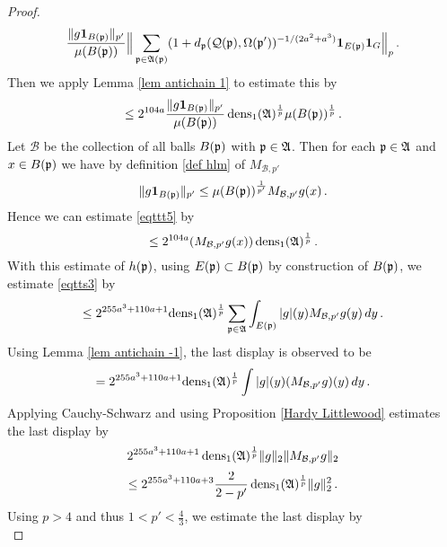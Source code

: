 {\begin{proof}
\begin{equation}
    \frac{\|g\mathbf{1}_{B(\mathfrak p)}\|_{p'}}{\mu(B(\mathfrak p))}
    \Big\|\sum_{\mathfrak p\in\mathfrak{A}(\mathfrak p)}(1+d_{\mathfrak p}(\mathcal{Q}(\mathfrak p), \Omega(\mathfrak p'))^{-1/(2a^2+a^3)}\mathbf{1}_{E(\mathfrak p)}\mathbf{1}_G\Big\|_{p}\, .
\end{equation}
Then we apply Lemma \ref{lem antichain 1} to estimate this by
\begin{equation}\label{eqttt5}
    \le  2^{104a}
    \frac{\|g\mathbf{1}_{B(\mathfrak p)}\|_{p'}}{\mu(B(\mathfrak p))}
    \operatorname{\operatorname{dens}}_1(\mathfrak{A})^{\frac 1p}\mu(B(\mathfrak p))^{\frac 1p}\,.
\end{equation}
Let $\mathcal{B}$ be the collection of all balls
$B(\mathfrak p)$ with $\mathfrak p\in \mathfrak{A}$. Then
for each $\mathfrak p\in \mathfrak{A}$ and $x\in B(\mathfrak p)$ we have by
definition  \eqref{def hlm} of $M_{\mathcal{B},p'}$
\begin{equation}
    \|g\mathbf{1}_{B(\mathfrak p)}\|_{p'}\le
    \mu(B(\mathfrak p))^{\frac 1{p'}} M_{\mathcal{B},p'}g(x) \, .
\end{equation}
Hence we can estimate \eqref{eqttt5} by
\begin{equation}
\label{eqttt5b}
    \le
    2^{104a}
    (M_{\mathcal{B}, p'}g(x))
   \operatorname{\operatorname{dens}}_1(\mathfrak{A})^{\frac 1p}\, .
\end{equation}
With this estimate of $h(\mathfrak p)$,
using $E(\mathfrak p)\subset B(\mathfrak p)$ by construction of $B(\mathfrak p)$, we estimate
\eqref{eqtts3} by
 \begin{equation}\label{eqtts4}
 \le  2^{255a^3+110a + 1} { \operatorname{\operatorname{dens}}_1(\mathfrak{A})^{\frac 1p}}\sum_{\mathfrak p\in \mathfrak{A}}
 \int_{E(\mathfrak p)}|g|(y)M_{\mathcal{B}, p'}g(y) \, dy\,.
         \end{equation}
Using Lemma \ref{lem antichain -1},
the last display is observed to be
\begin{equation}\label{eqtts4a}
=  2^{255a^3+110a + 1}
 {\operatorname{\operatorname{dens}}_1(\mathfrak{A})^{\frac 1p}} \int |g|(y)(M_{\mathcal{B}, p'}g)(y) \, dy\,.
         \end{equation}
Applying Cauchy-Schwarz and using Proposition \ref{Hardy Littlewood} estimates the last display by
\begin{equation}
    2^{255a^3+110a + 1} \operatorname{\operatorname{dens}}_1(\mathfrak{A})^{\frac 1p}
    \|g\|_2 \|M_{\mathcal{B}, p'} g\|_2
\end{equation}
\begin{equation}
    \le  2^{255a^3+110a + 3}\frac{2}{2-p'}
    \operatorname{\operatorname{dens}}_1(\mathfrak{A})^{\frac 1p}\|g\|_2 ^2\,.
\end{equation}
Using $p>4$ and thus $1<p'<\frac 43$, we estimate the last display by
\begin{equation}

\end{equation}
\end{proof}}
